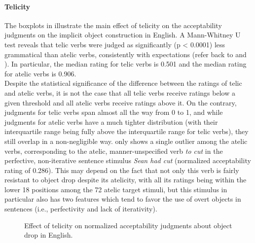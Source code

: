 \paragraph{Telicity}
The boxplots in  illustrate the main effect of telicity on the acceptability judgments on the implicit object construction in English. A Mann-Whitney U test reveals that telic verbs were judged as significantly (p < 0.0001) less grammatical than atelic verbs, consistently with expectations (refer back to  and ). In particular, the median rating for telic verbs is 0.501 and the median rating for atelic verbs is 0.906.\\
Despite the statistical significance of the difference between the ratings of telic and atelic verbs, it is not the case that all telic verbs receive ratings below a given threshold and all atelic verbs receive ratings above it. On the contrary, judgments for telic verbs span almost all the way from 0 to 1, and while judgments for atelic verbs have a much tighter distribution (with their interquartile range being fully above the interquartile range for telic verbs), they still overlap in a non-negligible way.
 only shows a single outlier among the atelic verbs, corresponding to the atelic, manner-unspecified verb \textit{to cut} in the perfective, non-iterative sentence stimulus \textit{Sean had cut} (normalized acceptability rating of 0.286). This may depend on the fact that not only this verb is fairly resistant to object drop despite its atelicity, with all its ratings being within the lower 18 positions among the 72 atelic target stimuli, but this stimulus in particular also has two features which tend to favor the use of overt objects in sentences (i.e., perfectivity and lack of iterativity).

\begin{figure}[htb]
\caption{Effect of telicity on normalized acceptability judgments about object drop in English.}
    
\end{figure}


